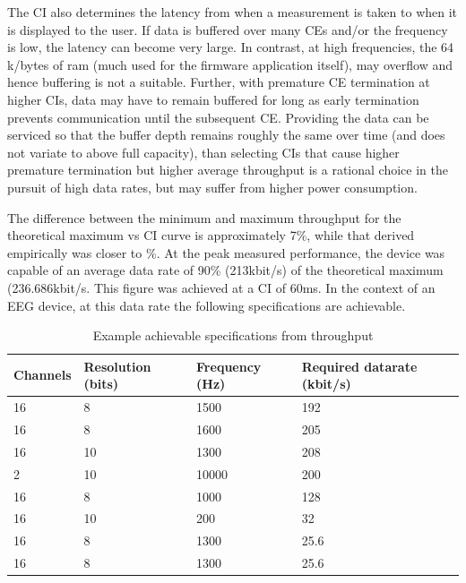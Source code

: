 \documentclass[]{article}
\begin{document}
The \ac{CI} also determines the latency from when a measurement is taken to when it is displayed to the user. If data is buffered over many \ac{CE}s and/or the frequency is low, the latency can become very large. In contrast, at high frequencies, the 64 k/bytes of ram (much used for the firmware application itself), may overflow and hence buffering is not a suitable. Further, with premature \ac{CE} termination at higher \ac{CI}s, data may have to remain buffered for long as early termination prevents communication until the subsequent \ac{CE}. Providing the data can be serviced so that the buffer depth remains roughly the same over time (and does not variate to above full capacity), than selecting \ac{CI}s that cause higher premature termination but higher average throughput is a rational choice in the pursuit of high data rates, but may suffer from higher power consumption.  



The difference between the minimum and maximum throughput for the theoretical maximum vs \ac{CI} curve is approximately 7$\%$, while that derived empirically was closer to $\%$. At the peak measured performance, the device was capable of an average data rate of 90\% (213kbit/s) of the theoretical maximum (236.686kbit/s. This figure was achieved at a \ac{CI} of 60ms. In the context of an \ac{EEG} device, at this data rate the following specifications are achievable.



\begin{table}[H]
\centering
\caption{Example achievable specifications from throughput}
\label{fig:sensors}
\begin{tabular}{|p{1.1in}|p{1.1in}|p{1.1in}|p{1.1in}|} \hline 
\textbf{Channels} & \textbf{Resolution (bits)} & \textbf{Frequency (Hz)} & \textbf{Required datarate (kbit/s)} \\ \hline 
16 & 8 & 1500 & 192 \\ \hline  
16 & 8 & 1600 & 205 \\ \hline
16 & 10 & 1300 & 208 \\ \hline  
2 & 10 & 10000 & 200  \\ \hline  
16 & 8 & 1000 & 128 \\ \hline  
16 & 10 & 200 & 32 \\ \hline  
16 & 8 & 1300 & 25.6 \\ \hline  
16 & 8 & 1300 & 25.6 \\ \hline  

\end{tabular}
\end{table}
\end{document}
